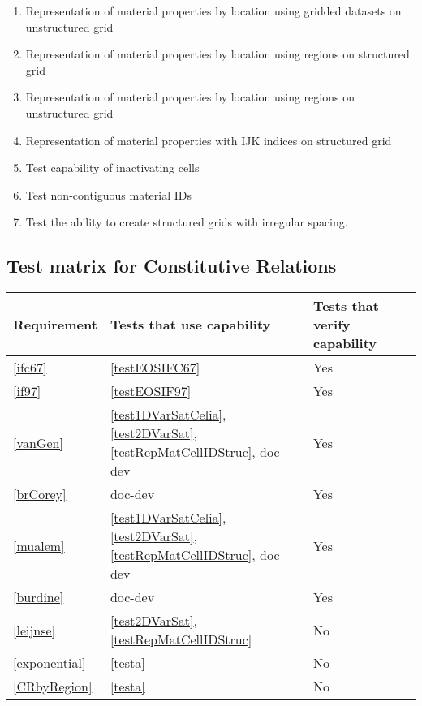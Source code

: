 \begin{enumerate}[label=Test \alph*.,ref=Test \alph*,nosep]
	\item \label{testRepMatGridUnstruc} Representation of material properties by location using gridded datasets on unstructured grid
	\item \label{testRepMatRegStruc} Representation of material properties by location using regions on structured grid
	\item \label{testRepMatRegUnstruc} Representation of material properties by location using regions on unstructured grid
	\item \label{testRepMatIJKStruc} Representation of material properties with IJK indices on structured grid
	\item \label{testInactive} Test capability of inactivating cells
	\item \label{testNonContMaterialIDS} Test non-contiguous material IDs
	\item \label{testStructIrregGrid} Test the ability to create structured grids with irregular spacing.
	
\end{enumerate}

\subsection{Test matrix for Constitutive Relations}
\begin{tabular}{|l|l|l|l|}
	\hline
	Requirement & Tests that use capability & Tests that verify capability \\
	\hline
	\hline
	\ref{ifc67} & \ref{testEOSIFC67} & Yes\\
	\hline
	\ref{if97} & \ref{testEOSIF97} & Yes \\
	\hline
		\ref{vanGen} & \ref{test1DVarSatCelia}, \ref{test2DVarSat}, \ref{testRepMatCellIDStruc}, doc-dev & Yes\\
	\hline
		\ref{brCorey} & doc-dev & Yes\\
	\hline
		\ref{mualem} & \ref{test1DVarSatCelia}, \ref{test2DVarSat},  \ref{testRepMatCellIDStruc}, doc-dev & Yes\\
	\hline
		\ref{burdine} & doc-dev & Yes\\
	\hline
		\ref{leijnse} &  \ref{test2DVarSat},  \ref{testRepMatCellIDStruc} & No \\
	\hline
		\ref{exponential} & \ref{testa} & No \\
	\hline
		\ref{CRbyRegion} & \ref{testa} & No \\
	\hline
\end{tabular}

